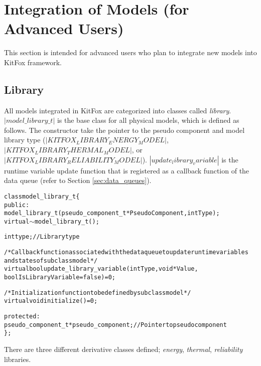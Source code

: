 \section{Integration of Models (for Advanced Users)}
\noindent
This section is intended for advanced users who plan to integrate new models into KitFox framework. 

\subsection{Library}
\noindent
All models integrated in KitFox are categorized into classes called \emph{library}. 
$|model\_library\_t|$ is the base class for all physical models, which is defined as follows. 
The constructor take the pointer to the pseudo component and model library type ($|KITFOX_LIBRARY_ENERGY_MODEL|$, $|KITFOX_LIBRARY_THERMAL_MODEL|$, or $|KITFOX_LIBRARY_RELIABILITY_MODEL|$). 
$|update_library_variable|$ is the runtime variable update function that is registered as a callback function of the data queue (refer to Section \ref{sec:data_queues}).
{
\fontsize{10pt}{11pt}\selectfont
\begin{alltt}
class model_library_t \{
public:
    model_library_t(pseudo_component_t *PseudoComponent, int Type);
    virtual \(\sim\)model_library_t();
    
    int type; // Library type
    
    /* Callback function associated with the data queue to update runtime variables 
    and states of subclass model */
    virtual bool update_library_variable(int Type, void *Value, 
                                         bool IsLibraryVariable = false) = 0;
                                         
    /* Initialization function to be defined by subclass model */
    virtual void initialize() = 0;
    
protected:
    pseudo_component_t *pseudo_component; // Pointer to pseudo component
\};
\end{alltt}
}

\noindent
There are three different derivative classes defined; \emph{energy}, \emph{thermal}, \emph{reliability} libraries.


